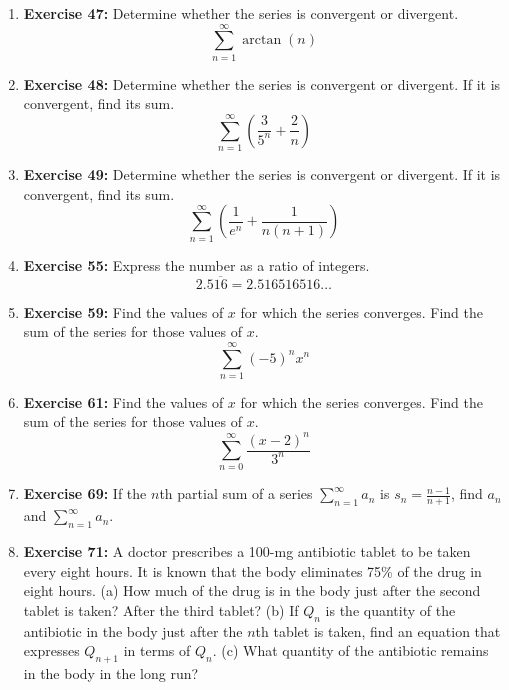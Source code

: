 \documentclass[12pt, a4paper]{article}
\begin{document}
\begin{enumerate}
    \item \textbf{Exercise 47:} Determine whether the series is convergent or divergent.
    \[ \sum_{n=1}^{\infty} \arctan(n) \]
    
    \item \textbf{Exercise 48:} Determine whether the series is convergent or divergent. If it is convergent, find its sum.
    \[ \sum_{n=1}^{\infty} \left( \frac{3}{5^n} + \frac{2}{n} \right) \]
    
    \item \textbf{Exercise 49:} Determine whether the series is convergent or divergent. If it is convergent, find its sum.
    \[ \sum_{n=1}^{\infty} \left( \frac{1}{e^n} + \frac{1}{n(n+1)} \right) \]

    \item \textbf{Exercise 55:} Express the number as a ratio of integers.
    \[ 2.5\overline{16} = 2.516516516\dots \]
    
    \item \textbf{Exercise 59:} Find the values of $x$ for which the series converges. Find the sum of the series for those values of $x$.
    \[ \sum_{n=1}^{\infty} (-5)^n x^n \]
    
    \item \textbf{Exercise 61:} Find the values of $x$ for which the series converges. Find the sum of the series for those values of $x$.
    \[ \sum_{n=0}^{\infty} \frac{(x-2)^n}{3^n} \]
    
    \item \textbf{Exercise 69:} If the $n$th partial sum of a series $\sum_{n=1}^{\infty} a_n$ is $s_n = \frac{n-1}{n+1}$, find $a_n$ and $\sum_{n=1}^{\infty} a_n$.

    \item \textbf{Exercise 71:} A doctor prescribes a 100-mg antibiotic tablet to be taken every eight hours. It is known that the body eliminates 75\% of the drug in eight hours. (a) How much of the drug is in the body just after the second tablet is taken? After the third tablet? (b) If $Q_n$ is the quantity of the antibiotic in the body just after the $n$th tablet is taken, find an equation that expresses $Q_{n+1}$ in terms of $Q_n$. (c) What quantity of the antibiotic remains in the body in the long run?
\end{enumerate}

\hrulefill
\vspace{1em}
\end{document}
